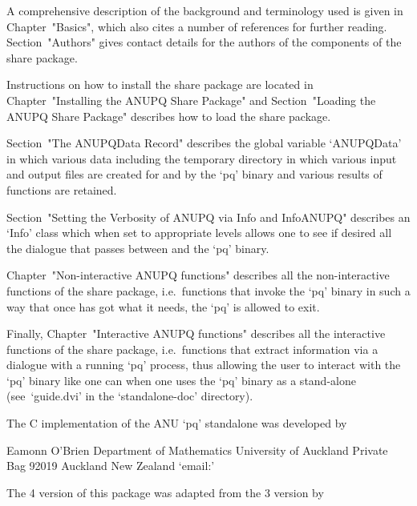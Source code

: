 \endlist


A comprehensive description of the background  and  terminology  used  is
given in Chapter~"Basics", which also cites a number  of  references  for
further reading. Section~"Authors" gives contact details for the  authors
of the components of the {\ANUPQ} share package.

Instructions on how to install the {\ANUPQ} share package are located  in
Chapter~"Installing the ANUPQ Share  Package"  and  Section~"Loading  the
ANUPQ Share Package" describes how to load the {\ANUPQ} share package.

Section~"The ANUPQData Record" describes the global variable  `ANUPQData'
in which various data including the temporary directory in which  various
input and output files are created for and by the `pq' binary and various
results of functions are retained.

Section~"Setting the Verbosity of ANUPQ via Info and InfoANUPQ" describes
an `Info' class which when set to appropriate levels allows one to see if
desired all the dialogue that passes between {\GAP} and the `pq' binary.

Chapter~"Non-interactive   ANUPQ    functions"    describes    all    the
non-interactive functions of the {\ANUPQ} share  package,  i.e.~functions
that invoke the `pq' binary in such a way that once {\GAP} has  got  what
it needs, the `pq' is allowed to exit.

Finally,  Chapter~"Interactive  ANUPQ  functions"   describes   all   the
interactive functions of the {\ANUPQ} share package, i.e.~functions  that
extract information via a dialogue with  a  running  `pq'  process,  thus
allowing the user to interact with the `pq' binary like one can when  one
uses  the  `pq'  binary  as  a  stand-alone   (see~`guide.dvi'   in   the
`standalone-doc' directory).


The C implementation of the ANU `pq' standalone was developed by

\begintt
Eamonn O'Brien
Department of Mathematics
University of Auckland
Private Bag 92019
Auckland
New Zealand
\endtt
{}`email:' 

The {\GAP} 4 version of this package was adapted from the {\GAP} 3
version by  

